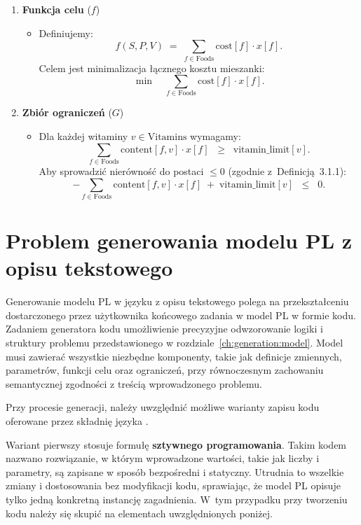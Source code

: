 \begin{enumerate}
  \item \textbf{Funkcja celu} (\boldmath$f$)
  \begin{itemize}
    \item Definiujemy:
    \[
      f(S,P,V) \;=\; \sum_{f \in \text{Foods}} \text{cost}[f] \cdot x[f].
    \]
    Celem jest minimalizacja łącznego kosztu mieszanki:
    \[
      \min \quad \sum_{f \in \text{Foods}} \text{cost}[f] \cdot x[f].
    \]
  \end{itemize}

  \item \textbf{Zbiór ograniczeń} (\boldmath$G$)
  \begin{itemize}
    \item Dla każdej witaminy $v \in \text{Vitamins}$ wymagamy:
    \[
      \sum_{f \in \text{Foods}} \text{content}[f,v] \cdot x[f]
      \;\;\geq\;\;
      \text{vitamin\_limit}[v].
    \]
    \medskip
    Aby sprowadzić nierówność do postaci $\leq 0$ (zgodnie z~Definicją~3.1.1):
    \[
      - \sum_{f \in \text{Foods}} \text{content}[f,v] \cdot x[f]
      \;+\;
      \text{vitamin\_limit}[v]
      \;\;\leq\;\; 0.
    \]
    \end{itemize}
\end{enumerate}

\section{Problem generowania modelu PL z opisu tekstowego}\label{ch:generation:generating}

Generowanie modelu PL w języku  z opisu tekstowego polega na przekształceniu dostarczonego przez użytkownika końcowego zadania w model PL w formie kodu. Zadaniem generatora kodu   umożliwienie precyzyjne odwzorowanie logiki i struktury problemu przedstawionego w rozdziale~\ref{ch:generation:model}. Model musi zawierać wszystkie niezbędne komponenty, takie jak definicje zmiennych, parametrów, funkcji celu oraz ograniczeń, przy równoczesnym zachowaniu semantycznej zgodności z treścią wprowadzonego problemu.

Przy procesie generacji, należy uwzględnić możliwe warianty zapisu kodu oferowane przez składnię języka . 

Wariant pierwszy stosuje formułę \textbf{sztywnego programowania}. Takim kodem nazwano rozwiązanie, w którym wprowadzone wartości, takie jak liczby i parametry, są zapisane w sposób bezpośredni i statyczny. Utrudnia to wszelkie zmiany i dostosowania bez modyfikacji kodu, sprawiając, że model PL opisuje tylko jedną konkretną instancję zagadnienia. W~tym przypadku przy tworzeniu kodu   należy się skupić na elementach uwzględnionych poniżej.

